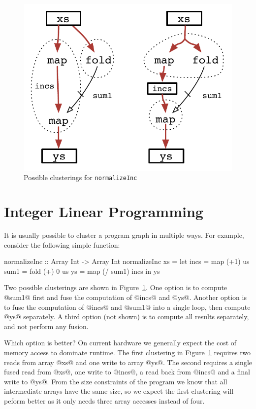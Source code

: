 
\begin{figure}
\begin{center}
\includegraphics[scale=0.5]{figures/ex2-normalizeInc.pdf}
\end{center}
\caption{Possible clusterings for \texttt{normalizeInc}}
\label{f:normalizeInc}
\end{figure}


\section{Integer Linear Programming}
\label{s:ILP}
It is usually possible to cluster a program graph in multiple ways. For example, consider the following simple function:
\begin{code}
 normalizeInc :: Array Int -> Array Int
 normalizeInc xs
  = let incs = map  (+1)     us
        sum1 = fold (+) 0    us
        ys   = map  (/ sum1) incs
    in  ys
\end{code}

Two possible clusterings are shown in Figure~\ref{f:normalizeInc}. One option is to compute @sum1@ first and fuse the computation of @incs@ and @ys@. Another option is to fuse the computation of @incs@ and @sum1@ into a single loop, then compute @ys@ separately. A third option (not shown) is to compute all results separately, and not perform any fusion. 

Which option is better? On current hardware we generally expect the cost of memory access to dominate runtime. The first clustering in Figure~\ref{f:normalizeInc} requires two reads from array @xs@ and one write to array @ys@. The second requires a single fused read from @xs@, one write to @incs@, a read back from @incs@ and a final write to @ys@. From the size constraints of the program we know that all intermediate arrays have the same size, so we expect the first clustering will peform better as it only needs three array accesses instead of four. 

